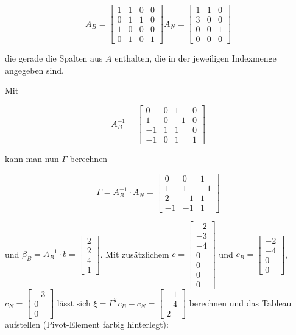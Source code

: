 \documentclass[a4paper, 12pt]{report}
\begin{document}
$$ A_B = \begin{bmatrix} 1 & 1 & 0 & 0\\0 & 1 & 1 & 0\\1 & 0 & 0 & 0\\0 & 1 & 0 & 1 \end{bmatrix} A_N = \begin{bmatrix} 1 & 1 & 0\\3 & 0 & 0\\0 & 0 & 1\\0 & 0 & 0 \end{bmatrix} $$

die gerade die Spalten aus $A$ enthalten, die in der jeweiligen Indexmenge angegeben sind.

Mit

$$ A_B^{-1} = \begin{bmatrix} 0 & 0 & 1 & 0\\1 & 0 & -1 & 0\\-1 & 1 & 1 & 0\\-1 & 0 & 1 & 1 \end{bmatrix} $$

kann man nun $\Gamma$ berechnen

$$ \Gamma = A_B^{-1}\cdot A_N = \begin{bmatrix} 0 & 0 & 1\\1 & 1 & -1\\2 & -1 & 1\\-1 & -1 & 1 \end{bmatrix} $$

und $\beta_B = A_B^{-1}\cdot b = \begin{bmatrix} 2\\2\\4\\1 \end{bmatrix}$. Mit zusätzlichem
$c = \begin{bmatrix} -2\\-3\\-4\\0\\0\\0\\0 \end{bmatrix}$ und $c_B = \begin{bmatrix} -2\\-4\\0\\0 \end{bmatrix}$,
$c_N = \begin{bmatrix} -3\\0\\0 \end{bmatrix}$ lässt sich $\xi = \Gamma^Tc_B - c_N = \begin{bmatrix} -1\\-4\\2 \end{bmatrix}$
berechnen und das Tableau aufstellen (Pivot-Element farbig hinterlegt):
\end{document}
